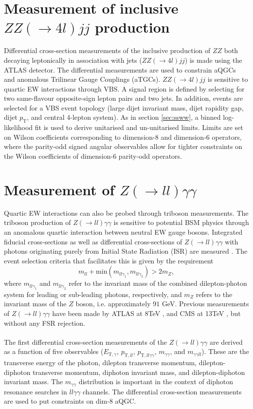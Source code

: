 \documentclass{v23windows}
\def\pt{\ensuremath{p_{\mathrm{T}}}\xspace}
\begin{document}
\section{Measurement of inclusive $ZZ(\rightarrow 4l)jj$ production}
Differential cross-section measurements of the inclusive production of $ZZ$ both decaying leptonically in association with jets ($ZZ(\rightarrow4l)jj$) is made using the ATLAS detector. The differential measurements are used to constrain aQGCs and anomalous Trilinear Gauge Couplings (aTGCs). \cite{zz4l}
$ZZ(\rightarrow 4l)jj$ is sensitive to quartic EW interactions through VBS. A signal region is defined by selecting for two same-flavour opposite-sign lepton pairs and two jets. In addition, events are selected for a VBS event topology (large dijet invariant mass, dijet rapidity gap, dijet \pt, and central 4-lepton system). As in section \ref{sec:ssww}, a binned log-likelihood fit is used to derive unitarised and un-unitarised limits. Limits are set on Wilson coefficients corresponding to dimension-8 and dimension-6 operators, where the parity-odd signed angular observables allow for tighter constraints on the Wilson coefficients of dimension-6 parity-odd operators.

\section{Measurement of $Z(\rightarrow ll)\gamma\gamma$}
Quartic EW interactions can also be probed through triboson measurements. The triboson production of $Z(\rightarrow ll)\gamma\gamma$ is sensitive to potential BSM physics through an anomalous quartic interaction between neutral EW gauge bosons. %
Integrated fiducial cross-sections as well as differential cross-sections of $Z(\rightarrow ll)\gamma\gamma$ with photons originating purely from Initial State Radiation (ISR) are measured \cite{zyy}. The event selection criteria that facilitates this is given by the requirement $$m_{ll}+\mathrm{min}(m_{ll\gamma_1},m_{ll\gamma_2})>2m_Z,$$ where $m_{ll\gamma_1}$ and $m_{ll\gamma_2}$ refer to the invariant mass of the combined dilepton-photon system for leading or sub-leading photons, respectively, and $m_{Z}$ refers to the invariant mass of the $Z$ boson, i.e. approximately $91$ GeV. Previous measurements of $Z(\rightarrow ll)\gamma\gamma$ have been made by ATLAS at 8TeV \cite{zyy_atlas}, and CMS at 13TeV \cite{zyy_cms}, but without any FSR rejection. \\\\
The first differential cross-section measurements of the $Z(\rightarrow ll)\gamma\gamma$ are derived as a function of five observables ($E_{\mathrm{T},\gamma}$, $p_{\mathrm{T},ll}$, $p_{\mathrm{T},ll\gamma\gamma}$, $m_{\gamma\gamma}$, and $m_{\gamma\gamma ll}$). These are the transverse energy of the photon, dilepton transverse momentum, dilepton-diphoton transverse momentum, diphoton invariant mass, and dilepton-diphoton invariant mass. The $m_{\gamma\gamma}$ distribution is important in the context of diphoton resonance searches in $ll\gamma\gamma$ channels. The differential cross-section measurements are used to put constraints on dim-8 aQGC.
\end{document}

